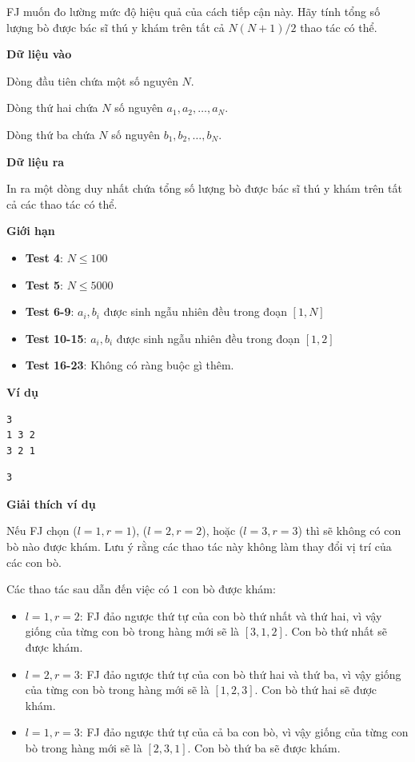 \documentclass[12pt,a4paper]{article}
\newcommand{\inputformat}{%
  \vspace{6pt}\textbf{\textcolor{sectioncolor}{Dữ liệu vào}}\par\vspace{2pt}%
}
\newcommand{\outputformat}{%
  \vspace{6pt}\textbf{\textcolor{sectioncolor}{Dữ liệu ra}}\par\vspace{2pt}%
}
\newcommand{\constraints}{%
  \vspace{6pt}\textbf{\textcolor{sectioncolor}{Giới hạn}}\par\vspace{2pt}%
}
\newcommand{\example}{%
  \vspace{6pt}\textbf{\textcolor{sectioncolor}{Ví dụ}}\par\vspace{2pt}%
}
\newcommand{\explanation}{%
  \vspace{6pt}\textbf{\textcolor{sectioncolor}{Giải thích ví dụ}}\par\vspace{2pt}%
}
\begin{document}
FJ muốn đo lường mức độ hiệu quả của cách tiếp cận này. Hãy tính tổng số lượng bò được bác sĩ thú y khám trên tất cả $N(N+1)/2$ thao tác có thể.

\inputformat
\begin{inputbox}
Dòng đầu tiên chứa một số nguyên $N$.

Dòng thứ hai chứa $N$ số nguyên $a_1, a_2, \dots, a_N$.

Dòng thứ ba chứa $N$ số nguyên $b_1, b_2, \dots, b_N$.
\end{inputbox}

\outputformat
\begin{outputbox}
In ra một dòng duy nhất chứa tổng số lượng bò được bác sĩ thú y khám trên tất cả các thao tác có thể.
\end{outputbox}

\constraints
\begin{constraintbox}
\begin{itemize}
    \item \textbf{Test 4}: $N \le 100$
    \item \textbf{Test 5}: $N \le 5000$
    \item \textbf{Test 6-9}: $a_i, b_i$ được sinh ngẫu nhiên đều trong đoạn $[1, N]$
    \item \textbf{Test 10-15}: $a_i, b_i$ được sinh ngẫu nhiên đều trong đoạn $[1, 2]$
    \item \textbf{Test 16-23}: Không có ràng buộc gì thêm.
\end{itemize}
\end{constraintbox}

\example

\begin{lstlisting}
3
1 3 2
3 2 1
\end{lstlisting}
\begin{lstlisting}
3
\end{lstlisting}

\explanation
Nếu FJ chọn ($l=1, r=1$), ($l=2, r=2$), hoặc ($l=3, r=3$) thì sẽ không có con bò nào được khám. Lưu ý rằng các thao tác này không làm thay đổi vị trí của các con bò.

Các thao tác sau dẫn đến việc có $1$ con bò được khám:
\begin{itemize}
    \item $l=1, r=2$: FJ đảo ngược thứ tự của con bò thứ nhất và thứ hai, vì vậy giống của từng con bò trong hàng mới sẽ là $[3, 1, 2]$. Con bò thứ nhất sẽ được khám.
    \item $l=2, r=3$: FJ đảo ngược thứ tự của con bò thứ hai và thứ ba, vì vậy giống của từng con bò trong hàng mới sẽ là $[1, 2, 3]$. Con bò thứ hai sẽ được khám.
    \item $l=1, r=3$: FJ đảo ngược thứ tự của cả ba con bò, vì vậy giống của từng con bò trong hàng mới sẽ là $[2, 3, 1]$. Con bò thứ ba sẽ được khám.
\end{itemize}
\end{document}
